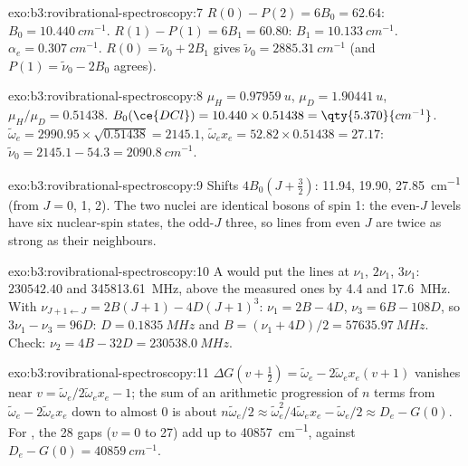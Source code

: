 \begin{solution}{exo:b3:rovibrational-spectroscopy:7}
$R(0) - P(2) = 6B_0 = 62.64$: $B_0 = \qty{10.440}{cm^{-1}}$. $R(1) - P(1) = 6B_1 = 60.80$:
$B_1 = \qty{10.133}{cm^{-1}}$. $\alpha_e = \qty{0.307}{cm^{-1}}$. $R(0) = \tilde\nu_0 + 2B_1$ gives
$\tilde\nu_0 = \qty{2885.31}{cm^{-1}}$ (and $P(1) = \tilde\nu_0 - 2B_0$ agrees).
\end{solution}

\begin{solution}{exo:b3:rovibrational-spectroscopy:8}
$\mu_H = \qty{0.97959}{u}$, $\mu_D = \qty{1.90441}{u}$, $\mu_H/\mu_D = 0.51438$. $B_0(\ce{DCl})
= 10.440 \times 0.51438 = \qty{5.370}{cm^{-1}}$. $\tilde\omega_e = 2990.95 \times \sqrt{0.51438}
= 2145.1$, $\tilde\omega_ex_e = 52.82 \times 0.51438 = 27.17$: $\tilde\nu_0 = 2145.1 - 54.3 =
\qty{2090.8}{cm^{-1}}$.
\end{solution}

\begin{solution}{exo:b3:rovibrational-spectroscopy:9}
Shifts $4B_0(J + \frac32)$: 11.94, 19.90, \qty{27.85}{cm^{-1}} (from $J = 0$, 1, 2). The
two  nuclei are identical bosons of spin 1: the even-$J$ levels have six
nuclear-spin states, the odd-$J$ three, so lines from even $J$ are twice as
strong as their neighbours.
\end{solution}

\begin{solution}{exo:b3:rovibrational-spectroscopy:10}
A  would put the lines at $\nu_1$, $2\nu_1$, $3\nu_1$: $230542.40$ and
\qty{345813.61}{MHz}, above the measured ones by 4.4 and \qty{17.6}{MHz}. With
$\nu_{J+1\leftarrow J} = 2B(J+1) - 4D(J+1)^3$: $\nu_1 = 2B - 4D$, $\nu_3 = 6B - 108D$, so
$3\nu_1 - \nu_3 = 96D$: $D = \qty{0.1835}{MHz}$ and $B = (\nu_1 + 4D)/2 =
\qty{57635.97}{MHz}$. Check: $\nu_2 = 4B - 32D = \qty{230538.0}{MHz}$.
\end{solution}

\begin{solution}{exo:b3:rovibrational-spectroscopy:11}
$\Delta G(v + \frac12) = \tilde\omega_e - 2\tilde\omega_ex_e(v+1)$ vanishes near $v =
\tilde\omega_e/2\tilde\omega_ex_e - 1$; the sum of an arithmetic progression of $n$ terms
from $\tilde\omega_e - 2\tilde\omega_ex_e$ down to almost 0 is about $n\tilde\omega_e/2 \approx
\tilde\omega_e^2/4\tilde\omega_ex_e - \tilde\omega_e/2 \approx D_e - G(0)$. For , the 28 gaps
($v = 0$ to 27) add up to \qty{40857}{cm^{-1}}, against $D_e - G(0) = \qty{40859}{cm^{-1}}$.
\end{solution}

